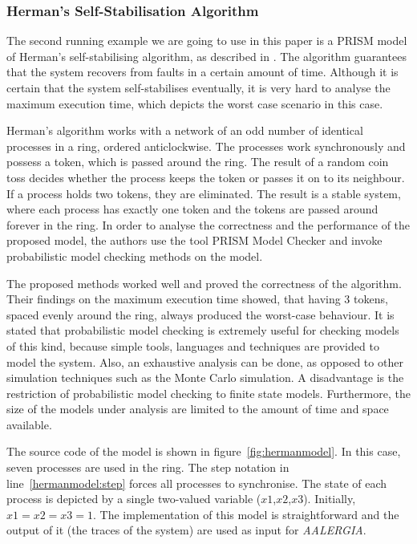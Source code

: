 \documentclass[
a4paper,
12pt
]{scrartcl}
\begin{document}
\subsubsection{Herman's Self-Stabilisation Algorithm}
The second running example we are going to use in this paper is a PRISM model of Herman's self-stabilising algorithm, as described in \cite{Kwiatkowska.2012}. The algorithm guarantees that the system recovers from faults in a certain amount of time. Although it is certain that the system self-stabilises eventually, it is very hard to analyse the maximum execution time, which depicts the worst case scenario in this case.
\par Herman's algorithm works with a network of an odd number of identical processes in a ring, ordered anticlockwise. The processes work synchronously and possess a token, which is passed around the ring. The result of a random coin toss decides whether the process keeps the token or passes it on to its neighbour. If a process holds two tokens, they are eliminated. The result is a stable system, where each process has exactly one token and the tokens are passed around forever in the ring. In order to analyse the correctness and the performance of the proposed model, the authors use the tool PRISM Model Checker and invoke probabilistic model checking methods on the model.
\par The proposed methods worked well and proved the correctness of the algorithm. Their findings on the maximum execution time showed, that having 3 tokens, spaced evenly around the ring, always produced the worst-case behaviour. It is stated that probabilistic model checking is extremely useful for checking models of this kind, because simple tools, languages and techniques are provided to model the system. Also, an exhaustive analysis can be done, as opposed to other simulation techniques such as the Monte Carlo simulation. A disadvantage is the restriction of probabilistic model checking to finite state models. Furthermore, the size of the models under analysis are limited to the amount of time and space available.
\par The source code of the model is shown in figure~\ref{fig:hermanmodel}. In this case, seven processes are used in the ring. The step notation in line~\ref{hermanmodel:step} forces all processes to synchronise. The state of each process is depicted by a single two-valued variable ($x1$,$x2$,$x3$). Initially, $x1=x2=x3=1$. The implementation of this model is straightforward and the output of it (the traces of the system) are used as input for \emph{AALERGIA}.
\end{document}
